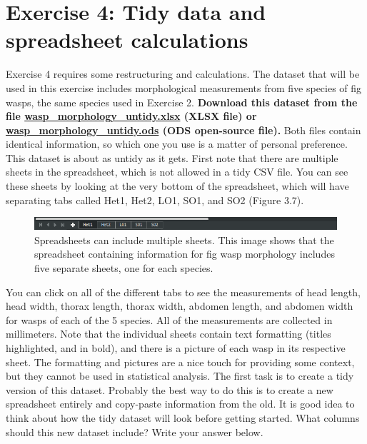 \documentclass[
]{scrbook}
\begin{document}
\hypertarget{exercise-4-tidy-data-and-spreadsheet-calculations}{%
\section{Exercise 4: Tidy data and spreadsheet calculations}\label{exercise-4-tidy-data-and-spreadsheet-calculations}}

Exercise 4 requires some restructuring and calculations.
The dataset that will be used in this exercise includes morphological measurements from five species of fig wasps, the same species used in Exercise 2.
\textbf{Download this dataset from the file \href{https://raw.githubusercontent.com/bradduthie/statistical_techniques/main/data/wasp_morphology_untidy.xlsx}{wasp\_morphology\_untidy.xlsx} (XLSX file) or \href{https://raw.githubusercontent.com/bradduthie/statistical_techniques/main/data/wasp_morphology_untidy.ods}{wasp\_morphology\_untidy.ods} (ODS open-source file).}
Both files contain identical information, so which one you use is a matter of personal preference.
This dataset is about as untidy as it gets.
First note that there are multiple sheets in the spreadsheet, which is not allowed in a tidy CSV file.
You can see these sheets by looking at the very bottom of the spreadsheet, which will have separating tabs called Het1, Het2, LO1, SO1, and SO2 (Figure 3.7).

\begin{figure}
\includegraphics[width=1\linewidth]{img/spreadsheet_tabs} \caption{Spreadsheets can include multiple sheets. This image shows that the spreadsheet containing information for fig wasp morphology includes five separate sheets, one for each species.}\label{fig:unnamed-chunk-15}
\end{figure}

You can click on all of the different tabs to see the measurements of head length, head width, thorax length, thorax width, abdomen length, and abdomen width for wasps of each of the 5 species.
All of the measurements are collected in millimeters.
Note that the individual sheets contain text formatting (titles highlighted, and in bold), and there is a picture of each wasp in its respective sheet.
The formatting and pictures are a nice touch for providing some context, but they cannot be used in statistical analysis.
The first task is to create a tidy version of this dataset.
Probably the best way to do this is to create a new spreadsheet entirely and copy-paste information from the old.
It is good idea to think about how the tidy dataset will look before getting started.
What columns should this new dataset include? Write your answer below.
\end{document}
